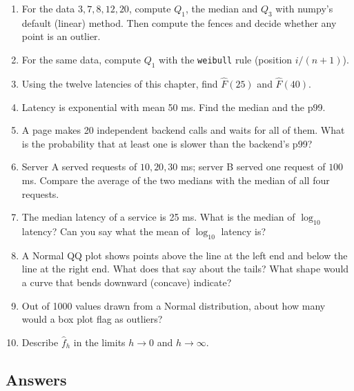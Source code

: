 \begin{enumerate}
  \item For the data $3, 7, 8, 12, 20$, compute $Q_1$, the median and $Q_3$ with numpy's
  default (linear) method. Then compute the fences and decide whether any point is an
  outlier.
  \item For the same data, compute $Q_1$ with the \texttt{weibull} rule (position
  $i/(n+1)$).
  \item Using the twelve latencies of this chapter, find $\hat F(25)$ and $\hat F(40)$.
  \item Latency is exponential with mean 50 ms. Find the median and the p99.
  \item A page makes 20 independent backend calls and waits for all of them. What is the
  probability that at least one is slower than the backend's p99?
  \item Server A served requests of $10, 20, 30$ ms; server B served one request of
  $100$ ms. Compare the average of the two medians with the median of all four requests.
  \item The median latency of a service is 25 ms. What is the median of $\log_{10}$
  latency? Can you say what the mean of $\log_{10}$ latency is?
  \item A Normal QQ plot shows points above the line at the left end and below the line at
  the right end. What does that say about the tails? What shape would a curve that bends
  downward (concave) indicate?
  \item Out of 1000 values drawn from a Normal distribution, about how many would a box plot
  flag as outliers?
  \item Describe $\hat f_h$ in the limits $h \to 0$ and $h \to \infty$.
\end{enumerate}

\subsection*{Answers}

